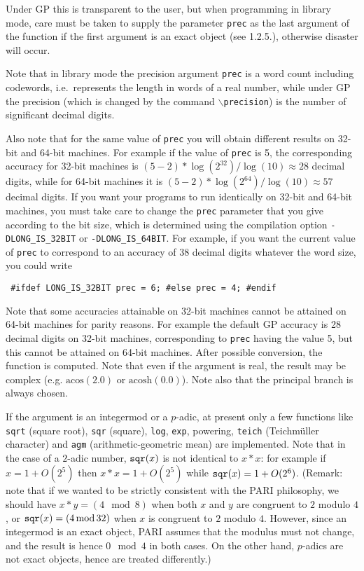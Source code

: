 Under GP this is transparent to the user, but when programming
in library mode, care must be taken to supply the parameter {\tt prec} as 
the last argument of the function if the first argument is an exact object
(see 1.2.5.), otherwise disaster will occur.

 Note that in library mode
the precision argument {\tt prec} is a word count including codewords,
i.e.~represents the length in words of a real number, while under GP
the precision (which is changed by the command {\tt $\backslash$precision})
is the number of significant decimal digits.

Also note that for the same value of {\tt prec} you will obtain
different results on 32-bit and 64-bit machines. For example if the
value of {\tt prec} is 5, the corresponding accuracy for 32-bit machines
is $(5-2)*\log(2^{32})/\log(10)\approx 28$ decimal digits, while
for 64-bit machines it is $(5-2)*\log(2^{64})/\log(10)\approx 57$
decimal digits. If you want your programs to run identically on 32-bit
and 64-bit machines, you must take care to change the {\tt prec}
parameter that you give according to the bit size, which is determined
using the compilation option {\tt -DLONG\_IS\_32BIT} or 
{\tt -DLONG\_IS\_64BIT}. For example, if you want the current value of
{\tt prec} to correspond to an accuracy of 38 decimal digits whatever
the word size, you could write

{\obeylines\tt
\#ifdef LONG\_IS\_32BIT
  prec = 6;
\#else
  prec = 4;
\#endif
}

Note that some accuracies attainable on 32-bit machines cannot be attained
on 64-bit machines for parity reasons. For example the default GP
accuracy is 28 decimal digits on 32-bit machines, corresponding to
{\tt prec} having the value 5, but this cannot be attained on 64-bit
machines.
\smallskip
After possible conversion, the function is computed. Note that even if 
the argument is real, the result may be complex (e.g. $\text{acos}(2.0)$
or $\text{acosh}(0.0)$).
Note also that the principal branch is always chosen.

\quad If the argument is an integermod or a $p$-adic, at present only a
few functions like {\tt sqrt} (square root), {\tt sqr} (square), {\tt log},
{\tt exp}, powering, {\tt teich} (Teichm\"uller character) and {\tt agm}
(arithmetic-geometric mean) are implemented.
Note that in the case of a $2$-adic number,
${\tt sqr}(x)$ is not identical to $x*x$: for example if
$x = 1+O(2^5)$ then $x*x = 1+O(2^5)$ while ${\tt sqr}(x) = 1+O(2^6)$.
(Remark: note that if we wanted to be strictly consistent with the
PARI philosophy, we should have $x*y= (4 \mod 8)$ when both $x$ and $y$ are
congruent to $2$ modulo $4$, or ${\tt sqr}(x)=(4\mod 32)$ when $x$ is
congruent to $2$ modulo $4$. However, since an integermod is an exact object,
PARI assumes that the modulus must not change, and the result is hence
$0 \mod 4$ in both cases. On the other hand, $p$-adics are not exact objects,
hence are treated differently.)

